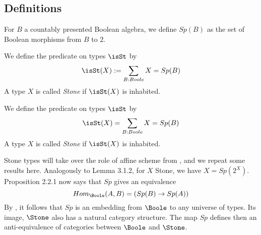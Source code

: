 \subsection{Definitions}
\begin{definition}
  For $B$ a countably presented Boolean algebra, we define $Sp(B)$ as the set of Boolean morphisms from $B$ to $2$. 
\end{definition}
\begin{definition}
  We define the predicate on types $\isSt$ by 
  \begin{equation}
    \isSt(X) := \sum\limits_{B : Boole} X = Sp(B)
  \end{equation} 
  A type $X$ is called \textit{Stone} if $\isSt(X)$ is inhabited.
\end{definition}

\begin{definition}
  We define the predicate on types $\isSt$ by 
  \begin{equation}
    \isSt(X) = \sum\limits_{B : Boole} X = Sp(B)
  \end{equation} 
  A type $X$ is called \textit{Stone} if $\isSt(X)$ is inhabited.
\end{definition}

Stone types will take over the role of affine scheme from \cite{draft}, 
and we repeat some results here. 
Analogously to Lemma 3.1.2, 
for $X$ Stone, we have $X = Sp(2^X)$. 
%
Proposition 2.2.1 now says that 
$Sp$ gives an equivalence 
\begin{equation}
   Hom_{\Boole} (A, B) = (Sp(B) \to Sp(A))
\end{equation}
By \cite{HoTT, p TODO}, it follows that 
$Sp$ is an embedding from $\Boole$ to any universe of types.
Its image, $\Stone$ also has a natural category structure.
The map $Sp$ defines then an anti-equivalence of categories between $\Boole$ and $\Stone$.

